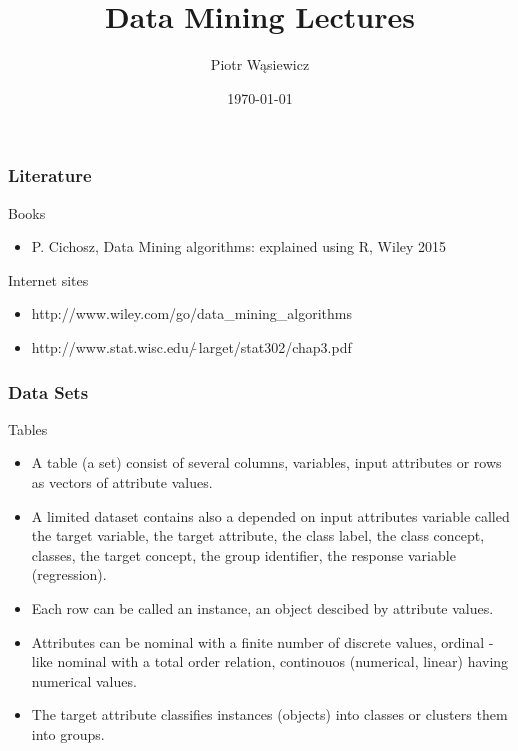 \documentclass{beamer}
\title[EARIN]{Data Mining Lectures}
\author{Piotr Wąsiewicz}
\institute[ICS PW]
{
Institute of Computer Science\\
\medskip
{\emph{pwasiewi@elka.pw.edu.pl}}
}
\date{\today}
\begin{document}

\lstset{frameround=trbl}
\lstset{commentstyle=\textit, stringstyle=\upshape,showspaces=false}

\begin{frame}
\titlepage
\end{frame}

\begin{frame}
\frametitle{Literature}
\begin{block}{Books}
\begin{itemize}
\item P. Cichosz, Data Mining algorithms: explained using R, Wiley 2015
\end{itemize}
\end{block}
\begin{block}{Internet sites}
\begin{itemize}
\item http://www.wiley.com/go/data\_mining\_algorithms
\item http://www.stat.wisc.edu/$\tilde{\ }$larget/stat302/chap3.pdf
\end{itemize}
\end{block}
\end{frame}

\begin{frame}
\small
\frametitle{Data Sets}
\begin{block}{Tables}
\begin{itemize}
\item A table (a set) consist of several columns, variables, input attributes or rows as vectors of attribute values.
\item A limited dataset contains also a depended on input attributes variable called the target variable, the target attribute, the class label, the class concept, classes, the target concept, the group identifier, the response variable (regression).
\item Each row can be called an instance, an object descibed by attribute values.
\item Attributes can be nominal with a finite number of discrete values, ordinal - like nominal with a total order relation, continouos (numerical, linear) having numerical values.
\item The target attribute classifies instances (objects) into classes or clusters them into groups.
\end{itemize}
\end{block}
\end{frame}
\end{document}

